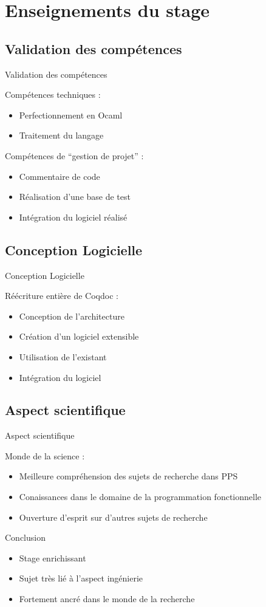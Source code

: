 \documentclass[compress]{beamer}
\newenvironment{tframe}[1]{
  \subsection{#1}
  \begin{frame}{#1}
  }{
  \end{frame}
  }
\begin{document}
\section{Enseignements du stage}

\begin{tframe}{Validation des compétences}
      Compétences techniques :
      \begin{itemize}
        \item Perfectionnement en Ocaml
        \item Traitement du langage
      \end{itemize}

      \medskip

      Compétences de ``gestion de projet'' :
      \begin{itemize}
        \item Commentaire de code
        \item Réalisation d'une base de test
        \item Intégration du logiciel réalisé
      \end{itemize}
\end{tframe}

\begin{tframe}{Conception Logicielle}
      Réécriture entière de Coqdoc :
      \begin{itemize}
        \item Conception de l'architecture
        \item Création d'un logiciel extensible
        \item Utilisation de l'existant
        \item Intégration du logiciel
      \end{itemize}
\end{tframe}

\begin{tframe}{Aspect scientifique}
      Monde de la science :
      \begin{itemize}
        \item Meilleure compréhension des sujets de recherche dans PPS
        \item Conaissances dans le domaine de la programmation fonctionnelle
        \item Ouverture d'esprit sur d'autres sujets de recherche
      \end{itemize}
\end{tframe}

\begin{frame}{Conclusion}
  \begin{itemize}
    \item Stage enrichissant
    \item Sujet très lié à l'aspect ingénierie
    \item Fortement ancré dans le monde de la recherche
  \end{itemize}
\end{frame}
\end{document}
